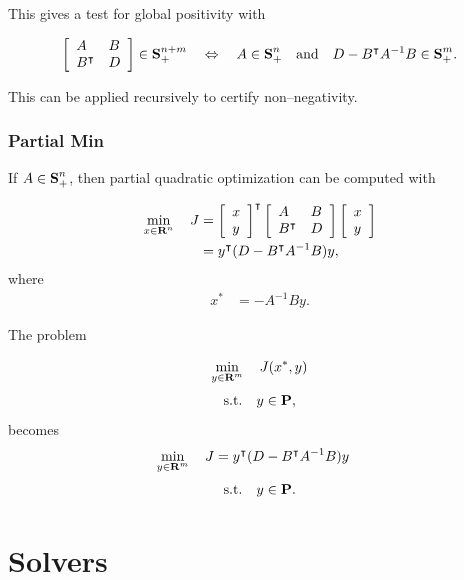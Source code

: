 \documentclass{article}
\begin{document}
        This gives a test for global positivity with
    
            \begin{align*}
                \left[\begin{array}{lllllllllllllllllll}A&B\\B^\intercal & D \end{array}\right] \in \textbf{S}_+^{n+m}\quad 
                \Leftrightarrow \quad A\in\textbf{S}_+^n \quad \text{and}\quad D-B^\intercal A^{-1}B\in\textbf{S}_+^m.
            \end{align*}
            
        This can be applied recursively to certify non--negativity.
    
    \subsubsection{Partial Min}
        If $A\in\textbf{S}_+^n$, then partial quadratic optimization can be computed with
    
        \begin{align*}
            \min_{x\in\textbf{R}^n}\quad 
            J&=\left[\begin{array}{lllllllllllllllllll}x\\y\end{array}\right]^\intercal \left[\begin{array}{lllllllllllllllllll}A & B \\ B^\intercal & D\end{array}\right]\left[\begin{array}{lllllllllllllllllll}x\\y\end{array}\right] \\
            &=
            y^\intercal(D-B^\intercal A^{-1} B)y,
        \end{align*}
        where
        \begin{align*}
            x^*&=-A^{-1}By.
        \end{align*}
    
        The problem

        \begin{align*}
            \min_{y\in\textbf{R}^m}\quad 
            J(x^*,y)
        \end{align*}
        \begin{align*}
            \text{s.t.}\quad y\in\textbf{P},
        \end{align*}
        becomes
        \begin{align*}
            \min_{y\in\textbf{R}^m}\quad 
            J&=y^\intercal(D-B^\intercal A^{-1} B)y
        \end{align*}
        \begin{align*}
            \text{s.t.}\quad y\in\textbf{P}.
        \end{align*}
\clearpage

\section{Solvers}
\end{document}
